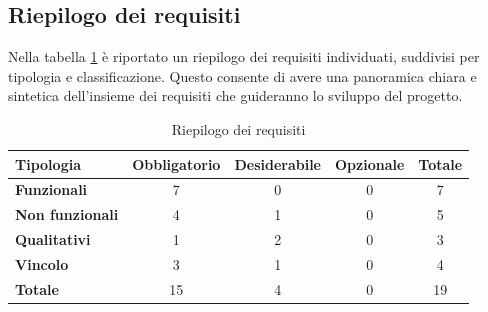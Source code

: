     \subsection{Riepilogo dei requisiti}
        Nella tabella \ref{tab:riepilogo-requisiti} è riportato un riepilogo dei requisiti individuati, suddivisi per tipologia e classificazione. Questo consente di avere una panoramica chiara e sintetica dell'insieme dei requisiti che guideranno lo sviluppo del progetto.
        \begin{table}[H]
            \centering
            \caption{Riepilogo dei requisiti}
            \label{tab:riepilogo-requisiti}
            \begin{tabular}{|l|c|c|c|c|}
            \hline\hline
            \rowcolor{gray!40}
            \textbf{Tipologia} & \textbf{Obbligatorio} & \textbf{Desiderabile} & \textbf{Opzionale} & \textbf{Totale}\\
            \hline
            \textbf{Funzionali} & 7 & 0 & 0 & 7\\
            \hline
            \textbf{Non funzionali} & 4 & 1 & 0 & 5\\
            \hline
            \textbf{Qualitativi} & 1 & 2 & 0 & 3\\
            \hline
            \textbf{Vincolo} & 3 & 1 & 0 & 4\\
            \hline
            \textbf{Totale} & 15 & 4 & 0 & 19\\
            \hline
            \end{tabular}
        \end{table}        
